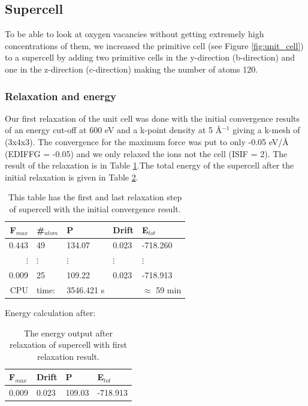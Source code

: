 \subsection{Supercell}

To be able to look at oxygen vacancies without getting extremely high concentrations of them, we increased the primitive cell (see Figure \ref{fig:unit_cell}) to a supercell by adding two primitive cells in the y-direction (b-direction) and one in the z-direction (c-direction) making the number of atoms 120. 

\subsubsection{Relaxation and energy}

Our first relaxation of the unit cell was done with the initial convergence results of an energy cut-off at 600 eV and a k-point density at 5 Å$^{-1}$ giving a k-mesh of (3x4x3). The convergence for the maximum force was put to only -0.05 eV/Å (EDIFFG = -0.05) and we only relaxed the ions not the cell (ISIF = 2). The result of the relaxation is in Table \ref{tab:ionstep_convergence}.The total energy of the supercell after the initial relaxation is given in Table \ref{tab:energy_supercell_after_relax}.

\begin{table}[H]\caption{This table has the first and last relaxation step of supercell with the initial convergence result.}\label{tab:ionstep_convergence}
\begin{tabular}{rllll}
F$_{max}$ &\#$_{atom}$&	P&	Drift&	E$_{tot}$\\ \hline
0.443&	49&	134.07&	0.023&	-718.260\\
$\vdots$&$\vdots$&$\vdots$&$\vdots$&$\vdots$\\
0.009&	25&	109.22&	0.023&	-718.913\\
CPU &time: & 3546.421 s & & $\approx$ 59 min  \\
\end{tabular}
\end{table}

Energy calculation after:
\begin{table}[H]\caption{The energy output after relaxation of supercell with first relaxation result.}\label{tab:energy_supercell_after_relax}
\begin{tabular}{llll}
F$_{max}$ & Drift&	P&	E$_{tot}$\\ \hline
0.009&	0.023&	109.03&	-718.913\\
\end{tabular}
\end{table}


